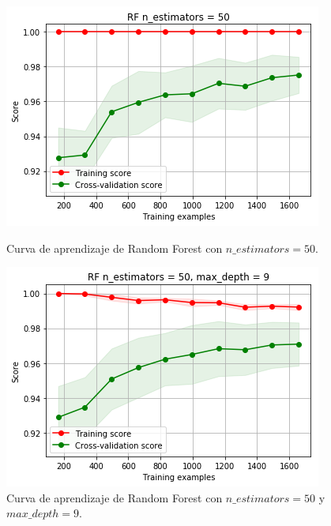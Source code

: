 \documentclass[11pt,a4paper]{article}
\begin{document}
\begin{figure}[H]
\centering
\begin{minipage}{.5\textwidth}
    \centering
    \includegraphics[scale=0.4]{img/lc-rf-n-50.png}
    \caption{Curva de aprendizaje de Random Forest con $n\_estimators=50$.}
    \label{fig:lc-rf-n-50}
\end{minipage}%
\begin{minipage}{.5\textwidth}
    \centering
    \includegraphics[scale=0.4]{img/lc-rf-n-50-d-9.png}
    \caption{Curva de aprendizaje de Random Forest con $n\_estimators=50$ y $max\_depth=9$.}
    \label{fig:lc-rf-n-50-d-9}
\end{minipage}
\end{figure}
\end{document}
